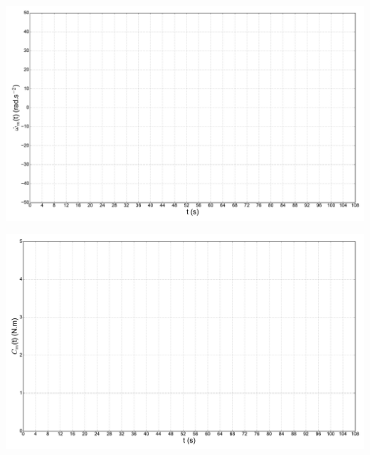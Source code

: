 








\cleardoublepage


\begin{center}
\includegraphics[width=0.95\linewidth]{img/accel}
\end{center}


\begin{center}
\includegraphics[width=0.95\linewidth]{img/couple}
\end{center}



